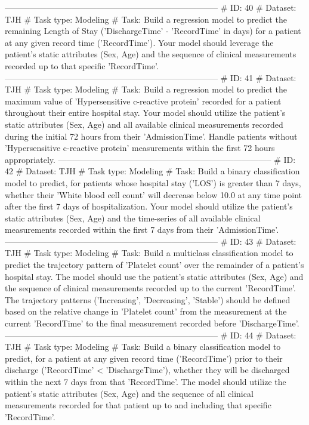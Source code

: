 \begin{tcolorbox}[colback=cadmiumgreen!5!white,colframe=forestgreen!75!white,breakable,title=\textit{Generated analytical tasks in task 4.}]
\begin{VerbatimWrap}
-----------------------------------------------------------------------------
# ID: 40  
# Dataset: TJH 
# Task type: Modeling
# Task: Build a regression model to predict the remaining Length of Stay ('DischargeTime' - 'RecordTime' in days) for a patient at any given record time ('RecordTime'). Your model should leverage the patient's static attributes (Sex, Age) and the sequence of clinical measurements recorded up to that specific 'RecordTime'.
-----------------------------------------------------------------------------
# ID: 41  
# Dataset: TJH 
# Task type: Modeling
# Task: Build a regression model to predict the maximum value of 'Hypersensitive c-reactive protein' recorded for a patient throughout their entire hospital stay. Your model should utilize the patient's static attributes (Sex, Age) and all available clinical measurements recorded during the initial 72 hours from their 'AdmissionTime'. Handle patients without 'Hypersensitive c-reactive protein' measurements within the first 72 hours appropriately.
-----------------------------------------------------------------------------
# ID: 42  
# Dataset: TJH 
# Task type: Modeling
# Task: Build a binary classification model to predict, for patients whose hospital stay ('LOS') is greater than 7 days, whether their 'White blood cell count' will decrease below 10.0 at any time point after the first 7 days of hospitalization. Your model should utilize the patient's static attributes (Sex, Age) and the time-series of all available clinical measurements recorded within the first 7 days from their 'AdmissionTime'.
-----------------------------------------------------------------------------
# ID: 43  
# Dataset: TJH 
# Task type: Modeling
# Task: Build a multiclass classification model to predict the trajectory pattern of 'Platelet count' over the remainder of a patient's hospital stay. The model should use the patient's static attributes (Sex, Age) and the sequence of clinical measurements recorded up to the current 'RecordTime'. The trajectory patterns ('Increasing', 'Decreasing', 'Stable') should be defined based on the relative change in 'Platelet count' from the measurement at the current 'RecordTime' to the final measurement recorded before 'DischargeTime'.
-----------------------------------------------------------------------------
# ID: 44  
# Dataset: TJH 
# Task type: Modeling
# Task: Build a binary classification model to predict, for a patient at any given record time ('RecordTime') prior to their discharge ('RecordTime' < 'DischargeTime'), whether they will be discharged within the next 7 days from that 'RecordTime'. The model should utilize the patient's static attributes (Sex, Age) and the sequence of all clinical measurements recorded for that patient up to and including that specific 'RecordTime'.

\end{VerbatimWrap}
\end{tcolorbox}
